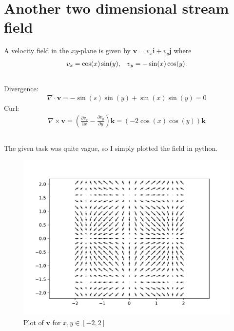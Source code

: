 \documentclass[a4paper,10pt,english]{article}
\begin{document}
\section{Another two dimensional stream field}
A velocity field in the $xy$-plane is given by $\bm{v} = v_x \bm{i} + v_y \bm{j}$ where 
\begin{align}
    v_x = \cos(x)\sin(y),\hspace{.3cm} v_y = -\sin(x)\cos(y).
    \label{eq:5}
\end{align}

\subsection{}
Divergence:
\begin{align*}
    \nabla \cdot \bm{v} = -\sin(s)\sin(y) + \sin(x)\sin(y) = 0
\end{align*}
Curl:
\begin{align*}
    \nabla \times \bm{v} 
    = \left( \frac{\partial v_x}{\partial x} - \frac{\partial v_y}{\partial y} \right)\bm{k}
    = (-2\cos(x)\cos(y))\bm{k}
\end{align*}

\newpage
\subsection{}
The given task was quite vague, so I simply plotted the field in python.

\vspace{-.5cm}
\begin{figure}[h]
    \centering
    \includegraphics[scale=0.7]{figures/figure_3_b.pdf}
    \caption{Plot of $\bm{v}$ for $x, y \in[-2, 2]$}
    \label{fig:figure_3_b}
\end{figure}
\end{document}
